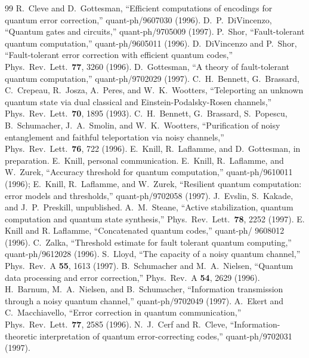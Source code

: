 \documentclass{report}
\begin{document}
\begin{thebibliography}{99}
 R.~Cleve and D.~Gottesman, ``Efficient computations of
encodings for quantum error correction,'' quant-ph/9607030 (1996).
 D.~P.~DiVincenzo, ``Quantum gates and circuits,''
quant-ph/9705009 (1997).
 P.~Shor, ``Fault-tolerant quantum computation,''
quant-ph/9605011 (1996).
 D.~DiVincenzo and P.~Shor, ``Fault-tolerant error
correction with efficient quantum codes,'' Phys.\ Rev.\ Lett.\ {\bf 77},
3260 (1996).
 D.~Gottesman, ``A theory of fault-tolerant
quantum computation,'' quant-ph/9702029 (1997).
 C.~H.~Bennett, G.~Brassard, C.~Crepeau, R.~Josza,
A.~Peres, and W.~K.~Wootters, ``Teleporting an unknown quantum state via dual
classical and Einstein-Podalsky-Rosen channels,'' Phys.\ Rev.\ Lett.\ {\bf 70}, 
1895 (1993).
 C.~H.~Bennett, G.~Brassard, S.~Popescu, B.~Schumacher,
J.~A.~Smolin, and W.~K.~Wootters, ``Purification of noisy entanglement and
faithful teleportation via noisy channels,'' Phys.\ Rev.\ Lett.\ {\bf 76},
722 (1996).
 E.~Knill, R.~Laflamme, and D.~Gottesman, in
preparation.
 E.~Knill, personal communication.
 E.~Knill, R.~Laflamme, and W.~Zurek, ``Accuracy
threshold for quantum computation,'' quant-ph/9610011 (1996); E.~Knill, 
R.~Laflamme, and W.~Zurek, ``Resilient quantum computation: error models
and thresholds,'' quant-ph/9702058 (1997).
 J.~Evslin, S.~Kakade, and J.~P.~Preskill, unpublished.
 A.~M.~Steane, ``Active stabilization, quantum
computation and quantum state synthesis,'' Phys.\ Rev.\ Lett.\ {\bf 78},
2252 (1997).
 E. Knill and R. Laflamme, ``Concatenated
quantum codes,'' quant-ph/ 9608012 (1996).
 C.~Zalka, ``Threshold estimate for fault tolerant quantum
computing,'' quant-ph/9612028 (1996).
 S.~Lloyd, ``The capacity of a noisy quantum channel,''
Phys.\ Rev.\ A {\bf 55}, 1613 (1997).
 B.~Schumacher and M.~A.~Nielsen, ``Quantum data
processing and error correction,'' Phys.\ Rev.\ A {\bf 54}, 2629 (1996).
 H.~Barnum, M.~A.~Nielsen, and B.~Schumacher, ``Information
transmission through a noisy quantum channel,'' quant-ph/9702049 (1997).
 A.~Ekert and C.~Macchiavello, ``Error correction in quantum
communication,'' Phys.\ Rev.\ Lett.\ {\bf 77}, 2585 (1996).
 N.~J.~Cerf and R.~Cleve, ``Information-theoretic
interpretation of quantum error-correcting codes,'' quant-ph/9702031 (1997).

\end{thebibliography}
\end{document}
